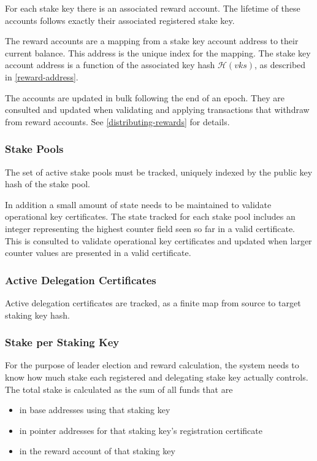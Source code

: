 \documentclass[11pt,a4paper]{article}
\begin{document}
For each stake key there is an associated reward account. The lifetime of
these accounts follows exactly their associated registered stake key.

The reward accounts are a mapping from a stake key account address to
their current balance. This address is the unique index for the mapping.
The stake key account address is a function of the associated key hash
\(\mathcal{H}(vks)\), as described in \cref{reward-address}.

The accounts are updated in bulk following the end of an epoch. They are
consulted and updated when validating and applying transactions that
withdraw from reward accounts. See \cref{distributing-rewards} for
details.

\subsubsection{Stake Pools}
\label{stake-pools}

The set of active stake pools must be tracked, uniquely indexed
by the public key hash of the stake pool.

In addition a small amount of state needs to be maintained to validate
operational key certificates. The state tracked for each stake pool includes
an integer representing the highest counter field seen so far in a valid
certificate. This is consulted to validate operational key certificates and
updated when larger counter values are presented in a valid certificate.

\subsubsection{Active Delegation Certificates}
\label{active-delegation-certificates}

Active delegation certificates are tracked, as a finite map from
source to target staking key hash.

\subsubsection{Stake per Staking Key}
\label{stake-per-staking-key}

For the purpose of leader election and reward calculation, the system
needs to know how much stake each registered and delegating stake key
actually controls. The total stake is calculated as the sum of all
funds that are
\begin{itemize}
\item in base addresses using that staking key
\item in pointer addresses for that staking key's registration
  certificate
\item in the reward account of that staking key
\end{itemize}
\end{document}

